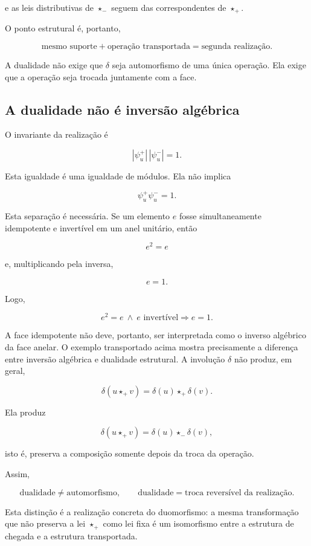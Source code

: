 \documentclass[11pt,a4paper]{article}
\begin{document}
e as leis distributivas de \(\star_-\) seguem das correspondentes de
\(\star_+\).

O ponto estrutural é, portanto,

$$
\boxed{
\text{mesmo suporte}
+
\text{operação transportada}
=
\text{segunda realização}.
}
$$

A dualidade não exige que \(\delta\) seja automorfismo de uma única
operação. Ela exige que a operação seja trocada juntamente com a face.

\subsection{A dualidade não é inversão algébrica}

O invariante da realização é

$$
\boxed{
|\psi_u^+|\,|\psi_u^-|=1.
}
$$

Esta igualdade é uma igualdade de módulos. Ela não implica

$$
\psi_u^+\psi_u^-=1.
$$

Esta separação é necessária. Se um elemento \(e\) fosse simultaneamente
idempotente e invertível em um anel unitário, então

$$
e^2=e
$$

e, multiplicando pela inversa,

$$
e=1.
$$

Logo,

$$
\boxed{
e^2=e\ \land\ e\text{ invertível}
\Longrightarrow e=1.
}
$$

A face idempotente não deve, portanto, ser interpretada como o inverso
algébrico da face anelar. O exemplo transportado acima mostra precisamente a diferença entre
inversão algébrica e dualidade estrutural. A involução \(\delta\) não
produz, em geral,

$$
\delta(u\star_+v)=\delta(u)\star_+\delta(v).
$$

Ela produz

$$
\boxed{
\delta(u\star_+v)=\delta(u)\star_-\delta(v),
}
$$

isto é, preserva a composição somente depois da troca da operação.

Assim,

$$
\boxed{
\text{dualidade}\neq\text{automorfismo},
\qquad
\text{dualidade}=\text{troca reversível da realização}.
}
$$

Esta distinção é a realização concreta do duomorfismo: a mesma
transformação que não preserva a lei \(\star_+\) como lei fixa é um
isomorfismo entre a estrutura de chegada e a estrutura transportada.
\end{document}
